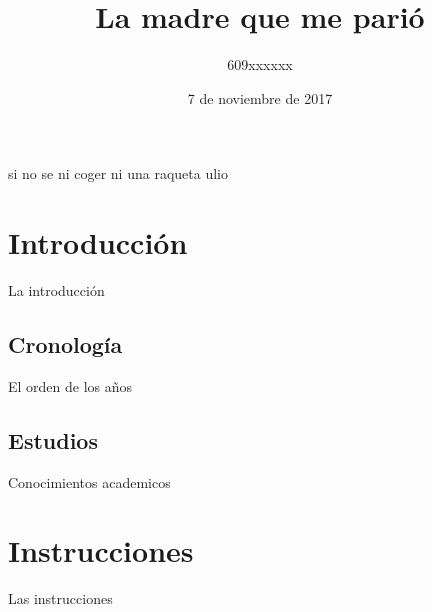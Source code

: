 \documentclass[10pt,a4paper]{article}
\date{7 de noviembre de 2017}
\author{609xxxxxx}
\title{La madre que me parió}
\begin{document}
\maketitle
si no se ni coger ni una raqueta ulio 
\section{Introducción}
La introducción
\subsection{Cronología}
El orden de los años
\subsection{Estudios}
Conocimientos academicos
\section{Instrucciones}
Las instrucciones
\end{document}
